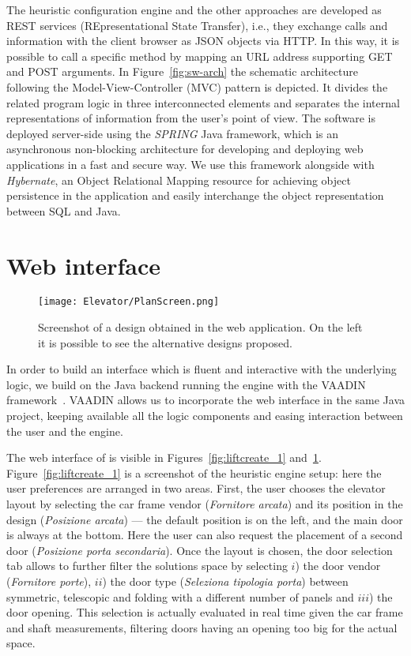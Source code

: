 The heuristic configuration engine and the other approaches are developed as
REST services (REpresentational State Transfer), i.e., they exchange calls and
information with the client browser as JSON objects via HTTP. In this way, it
is possible to call a specific method by mapping an URL address supporting
GET and POST arguments. In Figure~\ref{fig:sw-arch} the schematic architecture 
following the Model-View-Controller (MVC) pattern is depicted. It divides the
related program logic in three interconnected elements and separates the internal
representations of information from the user's point of view.
The software is deployed server-side using the \textit{SPRING} Java framework, 
which is an asynchronous non-blocking architecture for developing and deploying 
web applications in a fast and secure way. We use this framework alongside with
\textit{Hybernate}, an Object Relational Mapping resource for achieving object 
persistence in the application and easily interchange the object representation
between SQL and Java.

\section{Web interface}
\label{sec:web_if}

\begin{figure}[t]
	\caption{\label{fig:liftcreate_2} Screenshot of a \liftcreate{} design
		obtained in the web application. On the left it is possible to see the
		alternative designs proposed.}
	\centering
	\texttt{[image: Elevator/PlanScreen.png]}
\end{figure}

In order to build an interface which is fluent and interactive with the 
underlying logic, we build on the Java backend running the engine with the
VAADIN framework~\cite{vaadin14}. VAADIN allows us to incorporate 
the web interface in the same Java project, keeping available all the logic 
components and easing interaction between the user and the engine.

The web interface of \liftcreate{} is visible in Figures~\ref{fig:liftcreate_1}
and~\ref{fig:liftcreate_2}.
Figure~\ref{fig:liftcreate_1} is a screenshot of the heuristic engine
setup: here the user preferences are arranged in two areas.
First, the user chooses the elevator layout by selecting the car frame
vendor (\textit{Fornitore arcata}) and its position in the design 
(\textit{Posizione arcata}) --- the default position is on the left, 
and the main door is always at the bottom. Here the user can also 
request the placement of a second door (\textit{Posizione porta 
	secondaria}). Once the layout is chosen, the door selection tab
allows to further filter the solutions space by selecting $i$) the
door vendor (\textit{Fornitore porte}), $ii$) the door type
(\textit{Seleziona tipologia porta}) between symmetric, telescopic 
and folding with a different number of panels and $iii$) the door 
opening. This selection is actually evaluated in real time given the 
car frame and shaft measurements, filtering doors having an opening 
too big for the actual space.

